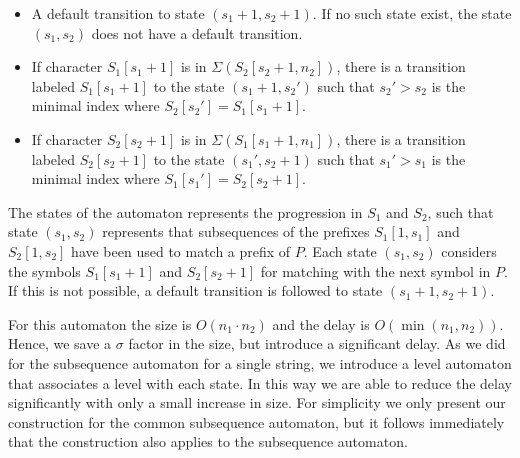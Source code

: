 \documentclass[a4paper,11pt]{article}
\begin{document}
\begin{itemize}
\item A default transition to state $(s_1+1,s_2+1)$. If no such state exist, the state $(s_1,s_2)$ does not have a default transition.
\item If character $S_1[s_1+1]$ is in $\Sigma(S_2[s_2+1,  n_2 ])$, there is a transition labeled $S_1[s_1+1]$ to the state $(s_1+1,s_2')$ such that $s_2'>s_2$ is the minimal index where $S_2[s_2']= S_1[s_1+1]$.
\item If character $S_2[s_2+1]$ is in $\Sigma(S_1[s_1+1,  n_1 ])$, there is a transition labeled $S_2[s_2+1]$ to the state $(s_1',s_2+1)$ such that $s_1'>s_1$ is the minimal index where $S_1[s_1']= S_2[s_2+1]$.
\end{itemize}

The states of the automaton represents the progression in $S_1$ and $S_2$, such that state $(s_1, s_2)$ represents that subsequences of the prefixes $S_1[1,s_1]$ and $S_2[1,s_2]$ have been used to match a prefix of $P$. Each state $(s_1, s_2)$ considers the symbols $S_1[s_1+1]$ and $S_2[s_2+1]$ for matching with the next symbol in $P$. If this is not possible, a default transition is followed to state $(s_1+1, s_2+1)$.

For this automaton the size is $O( n_1 \cdot  n_2 )$ and the delay is $O(\min( n_1 , n_2 ))$. Hence, we save a $\sigma$ factor in the size, but introduce a significant delay. As we did for the subsequence automaton for a single string, we introduce a level automaton that associates a level with each state. In this way we are able to reduce the delay significantly with only a small increase in size. For simplicity we only present our construction for the common subsequence automaton, but it follows immediately that the construction also applies to the subsequence automaton.
\end{document}
